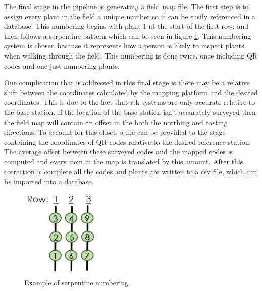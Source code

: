 The final stage in the pipeline is generating a field map file.  The first step is to assign every plant in the field a unique number so it can be easily referenced in a database.  This numbering begins with plant 1 at the start of the first row, and then follows a serpentine pattern which can be seen in figure \ref{figure:serpentine}. This numbering system is chosen because it represents how a person is likely to inspect plants when walking through the field.  This numbering is done twice, once including QR codes and one just numbering plants.  

One complication that is addressed in this final stage is there may be a relative shift between the coordinates calculated by the mapping platform and the desired coordinates.  This is due to the fact that \ac{rtk} systems are only accurate relative to the base station.  If the location of the base station isn't accurately surveyed then the field map will contain an offset in the both the northing and easting directions.   To account for this offset, a file can be provided to the stage containing the coordinates of QR codes relative to the desired reference station.  The average offset between these surveyed codes and the mapped codes is computed and every item in the map is translated by this amount. After this correction is complete all the codes and plants are written to a \ac{csv} file, which can be imported into a database.

\begin{figure}
	\centering
    \includegraphics[height=1.7in]{figures/sepentine.jpg}
    \caption[Serpentine numbering]{Example of serpentine numbering.}
    \label{figure:serpentine}
\end{figure}
